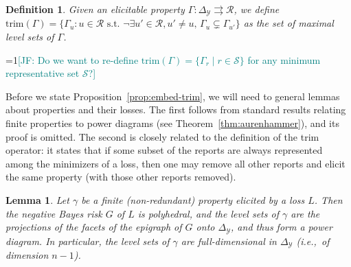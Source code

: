 \documentclass[11pt]{article}
\newcommand{\Comments}{1}
\newcommand{\mynote}[2]{\ifnum\Comments=1\textcolor{#1}{#2}\fi}
\newcommand{\mytodo}[2]{\ifnum\Comments=1%
  \todo[linecolor=#1!80!black,backgroundcolor=#1,bordercolor=#1!80!black]{#2}\fi}
\newcommand{\jessie}[1]{\mynote{teal}{[JF: #1]}}
\newcommand{\btw}[1]{\mytodo{gray!20!white}{BTW: #1}}%
\newcommand{\simplex}{\Delta_\Y}
\newcommand{\R}{\mathcal{R}}
\newcommand{\Sc}{\mathcal{S}}
\newcommand{\Y}{\mathcal{Y}}
\newcommand{\toto}{\rightrightarrows}
\newcommand{\trim}{\mathrm{trim}}
\newtheorem{lemma}{Lemma}
\newtheorem{definition}{Definition}
\begin{document}
\begin{definition}\label{def:trim}
  Given an elicitable property $\Gamma:\simplex \toto\R$, we define $\trim(\Gamma) = \{\Gamma_u : u \in \R \text{ s.t. } \neg\exists u'\in\R,u'\neq u,\, \Gamma_u \subsetneq \Gamma_{u'}\}$ as the set of maximal level sets of $\Gamma$.
\end{definition}
\jessie{Do we want to re-define $\trim(\Gamma) = \{\Gamma_r \mid r \in \Sc\}$ for any minimum representative set $\Sc$?}



Before we state Proposition~\ref{prop:embed-trim}, we will need to general lemmas about properties and their losses.
The first follows from standard results relating finite properties to power diagrams (see Theorem~\ref{thm:aurenhammer}), and its proof is omitted.
The second is closely related to the definition of the trim operator: it states that if some subset of the reports are always represented among the minimizers of a loss, then one may remove all other reports and elicit the same property (with those other reports removed).

\begin{lemma}\label{lem:finite-full-dim}
  Let $\gamma$ be a finite (non-redundant) property elicited by a loss $L$.
  Then the negative Bayes risk $G$ of $L$ is polyhedral, and the level sets of $\gamma$ are the projections of the facets of the epigraph of $G$ onto $\simplex$, and thus form a power diagram.
  In particular, the level sets of $\gamma$ are full-dimensional in $\simplex$ (i.e.,\ of dimension $n-1$).
\end{lemma}
\end{document}
